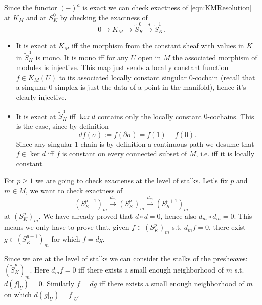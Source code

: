 \begin{rem}
	Since the functor $(-)^a$ is exact we can check exactness of \eqref{eqn:KMResolution} at $K_M$ and at $S^0_K$ by checking the exactness of
	\begin{equation}
		0 \to K_M \to \widetilde{S}^0_K \xrightarrow{d} \widetilde{S}^1_K
	.\end{equation} 
	\begin{itemize}
		\item It is exact at $K_M$ iff the morphism from the constant sheaf with values in $K$ in $\widetilde{S}^0_K$ is mono.
		It is mono iff for any $U$ open in $M$ the associated morphism of modules is injective.
		This map just sends a locally constant function $f \in K_M(U)$ to its associated locally constant singular $0$-cochain (recall that a singular $0$-simplex is just the data of a point in the manifold), hence it's clearly injective.
		\item It is exact at $\widetilde{S}^0_K$ iff $\ker d$ contains only the locally constant $0$-cochains.
			This is the case, since by definition
			\begin{equation}
				df (\sigma) := f (\partial \sigma) = f(1) - f(0)
			.\end{equation} 
			Since any singular $1$-chain is by definition a continuous path we desume that $f \in \ker d$ iff $f$ is constant on every connected subset of $M$, i.e. iff it is locally constant. 
	\end{itemize} 
\end{rem}

\begin{rem}
	For $p \geq 1$ we are going to check exactenss at the level of stalks.
	Let's fix $p$ and $m \in M$, we want to check exactness of
	\begin{equation}
		(S^{p-1}_K)_m \xrightarrow{d_m} \left( S^p_K \right)_m \xrightarrow{d_m} ( S^{p+1}_K )_m
	\end{equation} 
	at $\left( S^p_K \right)_m$.
	We have already proved that $d \circ d = 0$, hence also $d_m \circ d_m = 0$.
	This means we only have to prove that, given $f \in \left( S^p_K \right)_m$ s.t. $d_m f = 0$, there exist $g \in ( S^{p-1}_K )_m$ for which $f = dg$.

	Since we are at the level of stalks we can consider the stalks of the presheaves: $(\widetilde{S}^p_K)_m$.
	Here $d_mf = 0$ iff there exists a small enough neighborhood of $m$ s.t. $d(\left.f\right|_{U}) = 0$.
		Similarly $f = dg$ iff there exists a small enough neighborhood of $m$ on which $d(\left.g\right|_{U}) = \left.f\right|_{U}$.
\end{rem}

